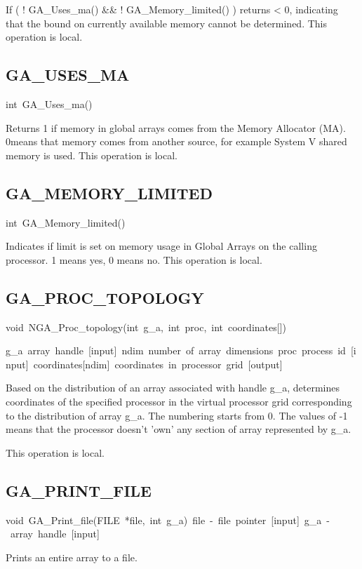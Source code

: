 If ( ! GA\_Uses\_ma() \&\& ! GA\_Memory\_limited() ) returns < 0,
indicating that the bound on currently available memory cannot be
determined. This operation is local. 


\subsection*{\label{sub:GA_USES_MA}GA\_USES\_MA}
\begin{lyxcode}
int~GA\_Uses\_ma()
\end{lyxcode}
Returns \textquotedbl{}1\textquotedbl{} if memory in global arrays
comes from the Memory Allocator (MA). \textquotedbl{}0\textquotedbl{}means
that memory comes from another source, for example System V shared
memory is used. This operation is local. 


\subsection*{\label{sub:GA_MEMORY_LIMITED}GA\_MEMORY\_LIMITED}
\begin{lyxcode}
int~GA\_Memory\_limited()
\end{lyxcode}
Indicates if limit is set on memory usage in Global Arrays on the
calling processor. \textquotedbl{}1\textquotedbl{} means \textquotedbl{}yes\textquotedbl{},
\textquotedbl{}0\textquotedbl{} means \textquotedbl{}no\textquotedbl{}.
This operation is local. 


\subsection*{\label{sub:GA_PROC_TOPOLOGY}GA\_PROC\_TOPOLOGY}
\begin{lyxcode}
void~NGA\_Proc\_topology(int~g\_a,~int~proc,~int~coordinates{[}{]})

g\_a~array~handle~{[}input{]}~ndim~number~of~array~dimensions~proc~process~id~{[}input{]}~coordinates{[}ndim{]}~coordinates~in~processor~grid~{[}output{]}
\end{lyxcode}
Based on the distribution of an array associated with handle g\_a,
determines coordinates of the specified processor in the virtual processor
grid corresponding to the distribution of array g\_a. The numbering
starts from 0. The values of -1 means that the processor doesn't 'own'
any section of array represented by g\_a.

This operation is local. 


\subsection*{\label{sub:GA_PRINT_FILE}GA\_PRINT\_FILE}
\begin{lyxcode}
void~GA\_Print\_file(FILE~{*}file,~int~g\_a)~file~-~file~pointer~{[}input{]}~g\_a~-~array~handle~{[}input{]}
\end{lyxcode}
Prints an entire array to a file.

